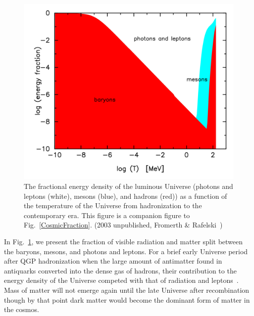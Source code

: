 \documentclass[universe,article,submit,moreauthors,pdftex,a4paper]{Definitions/mdpi}
\newcommand*{\rf}[1]{Fig.~{\ref{#1}}}
\newcommand*{\xblue}{\color{blue}}
\begin{document}
\begin{figure}[ht]
\centering
\includegraphics[width=\textwidth]{./plots/hadron_content.png}
\caption{The fractional energy density of the luminous Universe (photons and leptons (white), mesons (blue), and hadrons (red)) as a function of the temperature of the Universe from hadronization to the contemporary era. This figure is a companion figure to \rf{CosmicFraction}. (2003 unpublished, Fromerth \& Rafelski~\cite{Rafelski:2019twp})}
\label{hadron_content}
\end{figure}

In \rf{hadron_content}, we present the fraction of visible radiation and matter split between the baryons, mesons, and photons and leptons. {\xblue For a brief early Universe period after QGP hadronization  when the large amount of antimatter found in antiquarks converted into the dense gas of hadrons, their contribution to the energy density of the Universe competed  with that of radiation and leptons~\cite{Rafelski:2019twp}. Mass of matter will not emerge again} until the late Universe after recombination though by that point dark matter would become the dominant form of matter in the cosmos.
\end{document}
